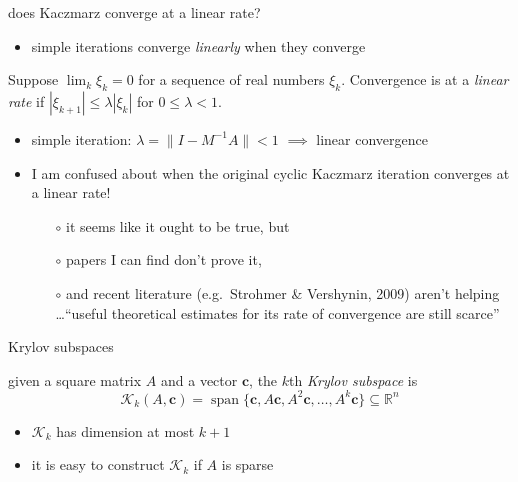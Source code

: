 \documentclass[usepdftitle=false,usenames,dvipsnames]{beamer}
\newcommand{\RR}{\mathbb{R}}
\newcommand{\Span}{\operatorname{span}}
\newcommand{\bc}{\mathbf{c}}
\begin{document}
\begin{frame}{does Kaczmarz converge at a linear rate?}

\begin{itemize}
\item simple iterations converge \emph{linearly} when they converge
\end{itemize}

\begin{definition} Suppose $\lim_k \xi_k = 0$ for a sequence of real numbers $\xi_k$.  Convergence is at a \emph{linear rate} if $|\xi_{k+1}| \le \lambda |\xi_k|$ for $0\le \lambda < 1$.
\end{definition}

\begin{itemize}
\item simple iteration: $\lambda=\|I-M^{-1}A\|<1$ $\implies$ linear convergence
\item I am confused about when the original cyclic Kaczmarz iteration converges at a linear rate!
    \begin{itemize}
    \item[$\circ$] it seems like it ought to be true, but
    \item[$\circ$] papers I can find don't prove it,
    \item[$\circ$] and recent literature (e.g.~Strohmer \& Vershynin, 2009) aren't helping \dots ``useful theoretical estimates for its rate of convergence are still scarce''
    \end{itemize}
\end{itemize}
\end{frame}


\begin{frame}{Krylov subspaces}

\begin{definition}[Krylov, 1931] given a square matrix $A$ and a vector $\bc$, the $k$th \emph{Krylov subspace} is
    $$\mathcal{K}_k(A,\bc) = \Span\{\bc,A\bc,A^2\bc,\dots,A^k\bc\} \subseteq \RR^n$$
\end{definition}

\begin{itemize}
\item $\mathcal{K}_k$ has dimension at most $k+1$
\item it is easy to construct $\mathcal{K}_k$ if $A$ is sparse
\end{itemize}
\end{frame}
\end{document}
